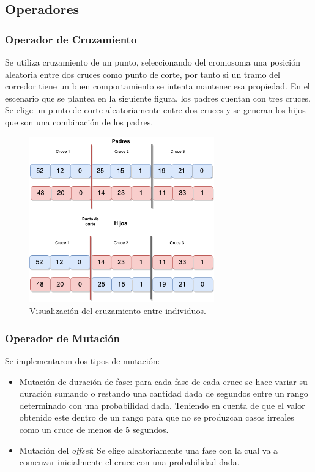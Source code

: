 \subsection{Operadores}
\subsubsection{Operador de Cruzamiento}
Se utiliza cruzamiento de un punto, seleccionando del cromosoma una posición aleatoria entre dos cruces como punto de corte, por tanto si un tramo del corredor tiene un buen comportamiento se intenta mantener esa propiedad. En el escenario que se plantea en la siguiente figura, los padres cuentan con tres cruces. Se elige un punto de corte aleatoriamente entre dos cruces y se generan los hijos que son una combinación de los padres.

\begin{figure}[H]
	\centering
	\includegraphics[width=8cm]{Figures/alg_cruzamiento}
	\caption{Visualización del cruzamiento entre individuos.}
	\label{fig:op_cruzamiento}
\end{figure}



\subsubsection{Operador de Mutación}
Se implementaron dos tipos de mutación:
\begin{itemize}

\item Mutación de duración de fase: para cada fase de cada cruce se hace variar su duración sumando o restando una cantidad dada de segundos entre un rango determinado con una probabilidad dada. Teniendo en cuenta de que el valor obtenido este dentro de un rango para que no se produzcan casos irreales como un cruce de menos de 5 segundos.

\item Mutación del \emph{offset}: Se elige aleatoriamente una fase con la cual va a comenzar inicialmente el cruce con una probabilidad dada.
\end{itemize}


